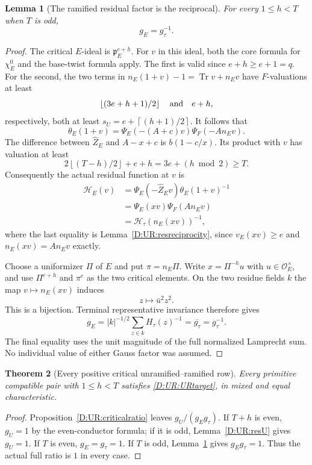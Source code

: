 \documentclass[11pt]{amsart}
\newtheorem{theorem}{Theorem}[section]
\newtheorem{lemma}[theorem]{Lemma}
\theoremstyle{definition}
\theoremstyle{remark}
\newcommand{\Tr}{\operatorname{Tr}}
\newcommand{\ceil}[1]{\left\lceil #1\right\rceil}
\newcommand{\floor}[1]{\left\lfloor #1\right\rfloor}
\newcommand{\OO}{\mathcal O}\newcommand{\pp}{\mathfrak p}\newcommand{\PP}{\mathfrak P}
\begin{document}
\begin{lemma}[The ramified residual factor is the reciprocal]\label{D:UR:resE}
For every $1\le h<T$ when $T$ is odd,
\[
 g_E=g_\tau^{-1}.
\]
\end{lemma}
\begin{proof}
The critical $E$-ideal is $\pp_E^{e+h}$. For $v$ in this ideal, both the
core formula for $\chi_E^0$ and the base-twist formula apply. The first is
valid since $e+h\ge e+1=q$. For the second, the two terms in
$n_E(1+v)-1=\Tr v+n_Ev$ have $F$-valuations at least
\[
 \floor{(3e+h+1)/2}\quad\hbox{and}\quad e+h,
\]
respectively, both at least
$s_U=e+\ceil{(h+1)/2}$. It follows that
\begin{equation}\label{D:UR:Ecriticalchar}
 \theta_E(1+v)=\Psi_E(-(A+c)v)\Psi_F(-A n_Ev).
\end{equation}
The difference between $\widehat Z_E$ and $A-x+c$ is $b(1-c/x)$.
Its product with $v$ has valuation at least
\[
 2\floor{(T-h)/2}+e+h
       =3e+(h\bmod2)\ge T.
\]
Consequently the actual residual function at $v$ is
\begin{align*}
 \mathcal H_E(v)
   &=\Psi_E(-\widehat Z_Ev)\theta_E(1+v)^{-1}\\
   &=\Psi_E(xv)\Psi_F(A n_Ev)\\
   &=\mathcal H_\tau(n_E(xv))^{-1},
\end{align*}
where the last equality is Lemma~\ref{D:UR:resreciprocity}, since
$v_E(xv)\ge e$ and $n_E(xv)=A n_Ev$ exactly.

Choose a uniformizer $\Pi$ of $E$ and put $\pi=n_E\Pi$.
Write $x=\Pi^{-h}u$ with $u\in\OO_E^\times$, and use $\Pi^{e+h}$ and
$\pi^e$ as the two critical elements. On the two residue fields $k$ the
map $v\mapsto n_E(xv)$ induces
\[
 z\longmapsto\bar u^2 z^2.
\]
This is a bijection. Terminal representative invariance therefore gives
\[
 g_E=|k|^{-1/2}\sum_{z\in k}H_\tau(z)^{-1}
      =\overline{g_\tau}=g_\tau^{-1}.
\]
The final equality uses the unit magnitude of the full normalized
Lamprecht sum. No individual value of either Gauss factor was assumed.
\end{proof}

\begin{theorem}[Every positive critical unramified--ramified row]
\label{D:UR:criticalcomplete}
Every primitive compatible pair with $1\le h<T$ satisfies
\eqref{D:UR:URtarget}, in mixed and equal characteristic.
\end{theorem}
\begin{proof}
Proposition~\ref{D:UR:criticalratio} leaves $g_U/(g_Eg_\tau)$.
If $T+h$ is even, $g_U=1$ by the even-conductor formula; if it is odd,
Lemma~\ref{D:UR:resU} gives $g_U=1$. If $T$ is even, $g_E=g_\tau=1$.
If $T$ is odd, Lemma~\ref{D:UR:resE} gives $g_Eg_\tau=1$.
Thus the actual full ratio is $1$ in every case.
\end{proof}
\end{document}

